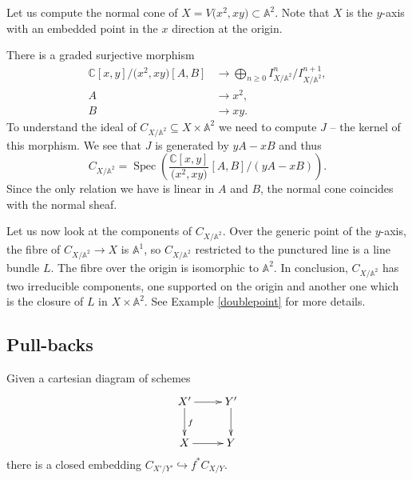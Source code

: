 \documentclass[pdftex]{sigma}
\numberwithin{equation}{section}
\newcommand{\Spec}{\operatorname{Spec}}
\theoremstyle{plain}
\theoremstyle{definition}
\theoremstyle{remark}
\begin{document}
 \begin{Example}\label{dorigin}
Let us compute the normal cone of $X=V\big(x^2,xy\big)\subset\mathbb{A}^2$. Note that $X$ is the $y$-axis with an embedded point in the $x$ direction at the origin.

There is a graded surjective morphism
\begin{align*}
\mathbb{C}[x,y]/\big(x^2,xy\big)[A,B]&\to\bigoplus_{n\geq 0}{ I^n_{X/\mathbb{A}^2}/ I^{n+1}_{X/\mathbb{A}^2} },\\
A &\to x^2,\\
B &\to xy.
\end{align*}
To understand the ideal of $C_{X/\mathbb{A}^2}\subseteq X\times\mathbb{A}^2$ we need to compute $J$ -- the kernel of this morphism.
We see that $J$ is generated by $yA-xB$ and thus
\[
C_{X/\mathbb{A}^2} =\Spec\left( \frac{\mathbb{C}[x,y]}{\big(x^2,xy\big)}[A,B]/(yA-xB) \right).
\]
Since the only relation we have is linear in $A$ and $B$, the normal cone coincides with the normal sheaf.

Let us now look at the components of $C_{X/\mathbb{A}^2}$. Over the generic point of the $y$-axis, the fibre of $C_{X/\mathbb{A}^2}\to X$ is $\mathbb{A}^1$, so $C_{X/\mathbb{A}^2}$ restricted to the punctured line is a line bundle $L$. The fibre over the origin is isomorphic to $\mathbb{A}^2$. In conclusion, $C_{X/\mathbb{A}^2}$ has two irreducible components, one supported on the origin and another one which is the closure of $L$ in $X\times \mathbb{A}^2$. See Example \ref{doublepoint} for more details.
\end{Example}

\subsection{Pull-backs}
Given a cartesian diagram of schemes
\[\xymatrix{X'\ar[r]\ar[d]^f &Y'\ar[d]\\
			X\ar[r] & Y}\]
there is a closed embedding $C_{X'/Y'}\hookrightarrow f^* C_{X/Y}.$
\end{document}
